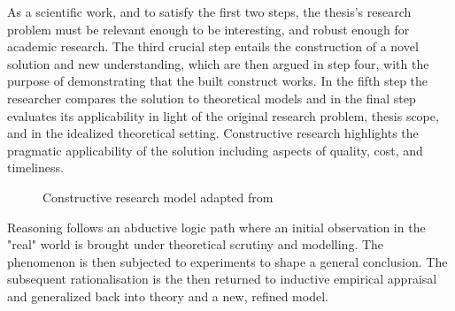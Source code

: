 \documentclass[12pt,a4paper,oneside,pdftex]{report}
\begin{document}
\vspace{6 mm}

As a scientific work, and to satisfy the first two steps, the thesis's research problem must be relevant enough to be interesting, and robust enough for academic research. The third crucial step entails the construction of a novel solution and new understanding, which are then argued in step four, with the purpose of demonstrating that the built construct works. In the fifth step the researcher compares the solution to theoretical models and in the final step evaluates its applicability in light of the original research problem, thesis scope, and in the idealized theoretical setting. Constructive research highlights the pragmatic applicability of the solution including aspects of quality, cost, and timeliness.

\begin{figure}[H]
\centering
\caption{Constructive research model adapted from \citet{kasanen1993constructive}} \label{fig:constructive}
\end{figure}

Reasoning follows an abductive logic path where an initial observation in the "real" world is brought under theoretical scrutiny and modelling. The phenomenon is then subjected to experiments to shape a general conclusion. \citep{josephson1996abductive} The subsequent rationalisation is the then returned to inductive empirical appraisal and generalized back into theory and a new, refined model. 
\end{document}
